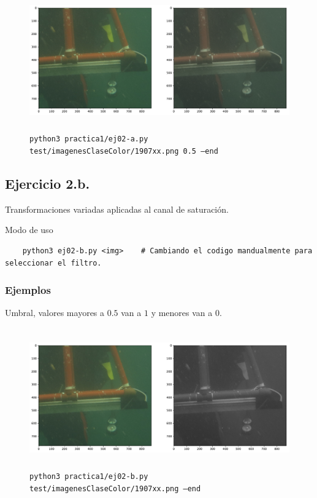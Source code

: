 \documentclass[11pt, spanish]{article}
\begin{document}
\begin{figure}[H]
\centering
  \includegraphics[height=6cm]{informe-imgs/ej02-a-4.pdf}
  \caption{\texttt{python3 practica1/ej02-a.py test/imagenesClaseColor/1907xx.png 0.5 --end}}
\end{figure}

\subsection{Ejercicio 2.b.}

Transformaciones variadas aplicadas al canal de saturación.

Modo de uso
\begin{verbatim}
    python3 ej02-b.py <img>    # Cambiando el codigo mandualmente para seleccionar el filtro.
\end{verbatim}

\subsubsection*{Ejemplos}

Umbral, valores mayores a $0.5$ van a $1$ y menores van a $0$.
\begin{figure}[H]
\centering
  \includegraphics[height=6cm]{informe-imgs/ej02-b-1.pdf}
  \caption{\texttt{python3 practica1/ej02-b.py test/imagenesClaseColor/1907xx.png --end}}
\end{figure}
\end{document}
